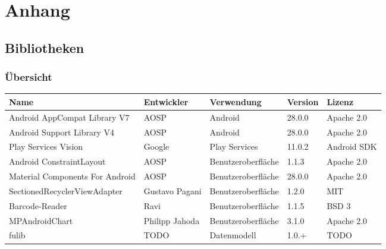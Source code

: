 \section{Anhang}\label{sec:bib}

\subsection{Bibliotheken}\label{subsec:bibliotheken}

\subsubsection{Übersicht} \label{subsubsec:libraries-overview}

\begin{tabularx}{\textwidth}{|X|l|l|l|l|}
    \hline
    \textbf{Name} & \textbf{Entwickler} & \textbf{Verwendung} & \textbf{Version} & \textbf{Lizenz} \\
    [0.5ex] \hline
    Android AppCompat Library V7 & AOSP & Android & 28.0.0 & Apache 2.0\\    %
    Android Support Library V4 & AOSP & Android & 28.0.0 & Apache 2.0\\   %
    \hline

    Play Services Vision & Google & Play Services & 11.0.2 & Android SDK\\  %
    \hline

    Android ConstraintLayout & AOSP & Benutzeroberfläche & 1.1.3 & Apache 2.0\\   %
    Material Components For Android & AOSP & Benutzeroberfläche & 28.0.0 & Apache 2.0\\  %
    SectionedRecyclerViewAdapter & Gustavo Pagani & Benutzeroberfläche & 1.2.0 & MIT\\   %
    Barcode-Reader & Ravi & Benutzeroberfläche & 1.1.5 & BSD 3\\   %
    MPAndroidChart & Philipp Jahoda & Benutzeroberfläche & 3.1.0 & Apache 2.0\\  %
    \hline

    fulib & TODO & Datenmodell & 1.0.+ & TODO\\    %
    \hline


\end{tabularx}

